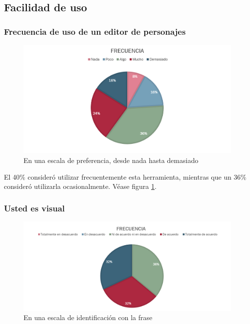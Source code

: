 \documentclass[]{article}
\begin{document}
\subsection{Facilidad de uso}

\subsubsection{Frecuencia de uso de un editor de personajes}
\begin{figure}[H]
	
	\centering
	\includegraphics[width=1\textwidth]{Encuesta_facilidad_personajes}
	\caption{En una escala de preferencia, desde nada hasta demasiado} 
	\label{EDITPERS}
	
\end{figure}
El 40\% consider\'o utilizar frecuentemente esta herramienta, mientras que un 36\% consider\'o utilizarla ocasionalmente. V\'ease figura \ref{EDITPERS}.
\subsubsection{Usted es visual}
\begin{figure}[H]
	
	\centering
	\includegraphics[width=1\textwidth]{Encuesta_facilidad_observacion}
	\caption{En una escala de identificaci\'on con la frase} 
	\label{OBSV}
	
\end{figure}
\end{document}
